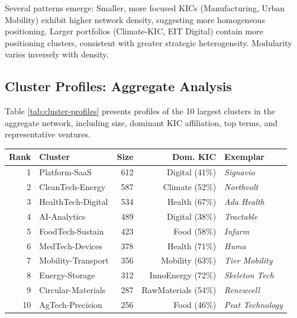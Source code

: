 \documentclass[../main.tex]{subfiles}
\begin{document}
Several patterns emerge: Smaller, more focused KICs (Manufacturing, Urban Mobility) exhibit higher network density, suggesting more homogeneous positioning. Larger portfolios (Climate-KIC, EIT Digital) contain more positioning clusters, consistent with greater strategic heterogeneity. Modularity varies inversely with density.

\subsection{Cluster Profiles: Aggregate Analysis}

Table \ref{tab:cluster-profiles} presents profiles of the 10 largest clusters in the aggregate network, including size, dominant KIC affiliation, top terms, and representative ventures.

\begin{center}
\scriptsize
\begin{tabular}{rlrrl}
\toprule
\textbf{Rank} & \textbf{Cluster} & \textbf{Size} & \textbf{Dom. KIC} & \textbf{Exemplar} \\
\midrule
1 & Platform-SaaS & 612 & Digital (41\%) & \textit{Signavio} \\
2 & CleanTech-Energy & 587 & Climate (52\%) & \textit{Northvolt} \\
3 & HealthTech-Digital & 534 & Health (67\%) & \textit{Ada Health} \\
4 & AI-Analytics & 489 & Digital (38\%) & \textit{Tractable} \\
5 & FoodTech-Sustain & 423 & Food (58\%) & \textit{Infarm} \\
6 & MedTech-Devices & 378 & Health (71\%) & \textit{Huma} \\
7 & Mobility-Transport & 356 & Mobility (63\%) & \textit{Tier Mobility} \\
8 & Energy-Storage & 312 & InnoEnergy (72\%) & \textit{Skeleton Tech} \\
9 & Circular-Materials & 287 & RawMaterials (54\%) & \textit{Renewcell} \\
10 & AgTech-Precision & 256 & Food (46\%) & \textit{Peat Technology} \\
\bottomrule
\end{tabular}
\end{center}
\end{document}
